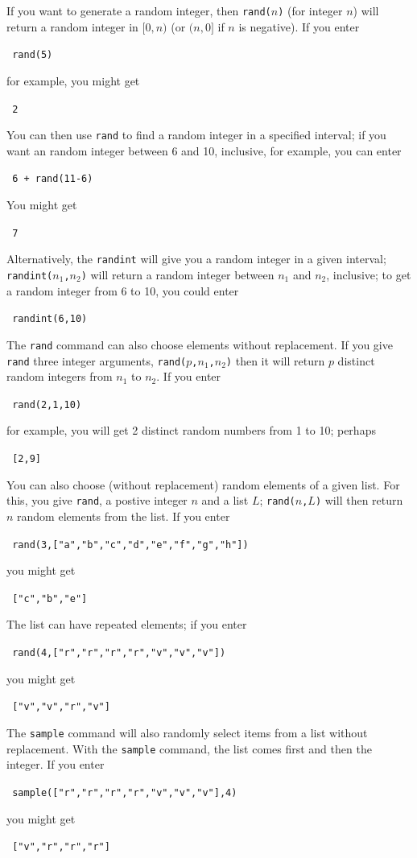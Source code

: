 \documentclass[a4paper,11pt]{book}
\begin{document}
If you want to generate a random integer, then \texttt{rand($n$)} (for
integer $n$) will return a random integer in $[0,n)$ (or $(n,0]$ if
$n$ is negative).  If you enter
\begin{center}
  \tt
  rand(5)
\end{center}
for example, you might get
\begin{center}
  \tt
  2
\end{center}

You can then use \texttt{rand} to find a random integer in a specified interval; if
you want an random integer between 6 and 10, inclusive, for example,
you can enter
\begin{center}
  \tt
  6 + rand(11-6)
\end{center}
You might get
\begin{center}
  \tt
  7
\end{center}
Alternatively, the \texttt{randint} will give you a random integer in
a given interval; \texttt{randint($n_1$,$n_2$)} will return a random
integer between $n_1$ and $n_2$, inclusive; to get a random integer
from 6 to 10, you could enter
\begin{center}
  \tt
  randint(6,10)
\end{center}

The \texttt{rand} command can also choose elements without
replacement.  If you give \texttt{rand} three integer arguments, 
\texttt{rand($p$,$n_1$,$n_2$)} then it will return $p$ distinct random
integers from $n_1$ to $n_2$.  If you enter
\begin{center}
  \tt
  rand(2,1,10)
\end{center}
for example, you will get 2 distinct random numbers from 1 to 10;
perhaps
\begin{center}
  \tt
  [2,9]
\end{center}

You can also choose (without replacement) random elements of a given
list.  For this, you give \texttt{rand}, a postive integer $n$
and a list $L$; \texttt{rand($n$,$L$)} will then return $n$ random
elements from the list.  If you enter
\begin{center}
  \tt
  rand(3,["a","b","c","d","e","f","g","h"])
\end{center}
you might get
\begin{center}
  \tt
  ["c","b","e"]
\end{center}
The list can have repeated elements; if you enter
\begin{center}
  \tt
  rand(4,["r","r","r","r","v","v","v"])
\end{center}
you might get
\begin{center}
  \tt
  ["v","v","r","v"]
\end{center}
The \texttt{sample} command will also randomly select items from a
list without replacement.  With the \texttt{sample} command, the list
comes first and then the integer.  If you enter
\begin{center}
  \tt
  sample(["r","r","r","r","v","v","v"],4)
\end{center}
you might get
\begin{center}
  \tt
  ["v","r","r","r"]
\end{center}
\end{document}
